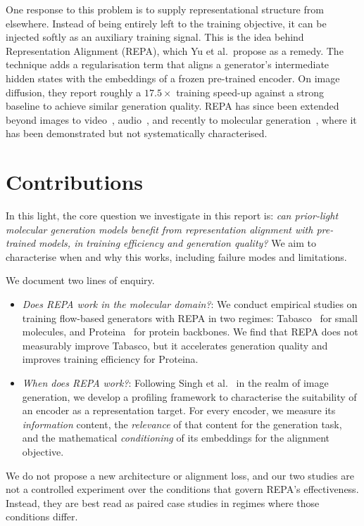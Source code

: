 \documentclass[12pt,a4paper,twoside]{report}
\begin{document}
One response to this problem is to supply representational structure from elsewhere. Instead of being entirely left to the training objective, it can be injected softly as an auxiliary training signal. This is the idea behind Representation Alignment (REPA), which Yu et al.~propose as a remedy. The technique adds a regularisation term that aligns a generator's intermediate hidden states with the embeddings of a frozen pre-trained encoder. On image diffusion, they report roughly a $17.5\times$ training speed-up against a strong baseline to achieve similar generation quality. REPA has since been extended beyond images to video~\cite{VideoREPA}, audio~\cite{TARO}, and recently to molecular generation~\cite{REED,BoltzREPA}, where it has been demonstrated but not systematically characterised.

\section{Contributions}
\label{sec:contributions}

In this light, the core question we investigate in this report is: \emph{can prior-light molecular generation models benefit from representation alignment with pre-trained models, in training efficiency and generation quality?} We aim to characterise when and why this works, including failure modes and limitations.

We document two lines of enquiry.
\begin{itemize}
  \item[(i)] \emph{Does REPA work in the molecular domain?}: We conduct empirical studies on training flow-based generators with REPA in two regimes: Tabasco~\cite{Tabasco} for small molecules, and Proteina~\cite{Proteina} for protein backbones. We find that REPA does not measurably improve Tabasco, but it accelerates generation quality and improves training efficiency for Proteina.
  \item[(ii)] \emph{When does REPA work?}: Following Singh et al.~\cite{SpatialStructure} in the realm of image generation, we develop a profiling framework to characterise the suitability of an encoder as a representation target. For every encoder, we measure its \emph{information} content, the \emph{relevance} of that content for the generation task, and the mathematical \emph{conditioning} of its embeddings for the alignment objective.
\end{itemize}

We do not propose a new architecture or alignment loss, and our two studies are not a controlled experiment over the conditions that govern REPA's effectiveness. Instead, they are best read as paired case studies in regimes where those conditions differ.
\end{document}
